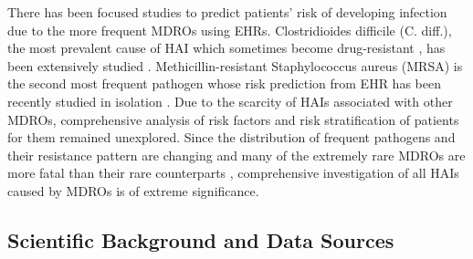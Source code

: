 There has been focused studies to predict patients' risk of developing infection due to the more frequent MDROs using EHRs. Clostridioides difficile (C. diff.), the most prevalent cause of HAI which sometimes become drug-resistant \cite{tenover2012antimicrobial, peng2017update, spigaglia2016recent}, has been extensively studied \cite{oh2018generalizable, wiens2012learning, wiens2014learning, wiens2012patient}.  Methicillin-resistant Staphylococcus aureus (MRSA) is the second most frequent pathogen whose risk prediction from EHR has been recently studied in isolation \cite{hartvigsen2018early}. Due to the scarcity of HAIs associated with other MDROs, comprehensive analysis of risk factors and risk stratification of patients for them remained unexplored. Since the distribution of frequent pathogens and their resistance pattern are changing \cite{weiner2016antimicrobial} and many of the extremely rare MDROs are more fatal than their rare counterparts \cite{resistance}, comprehensive investigation of all HAIs caused by MDROs is of extreme significance. 





\subsection{Scientific Background and Data Sources}

